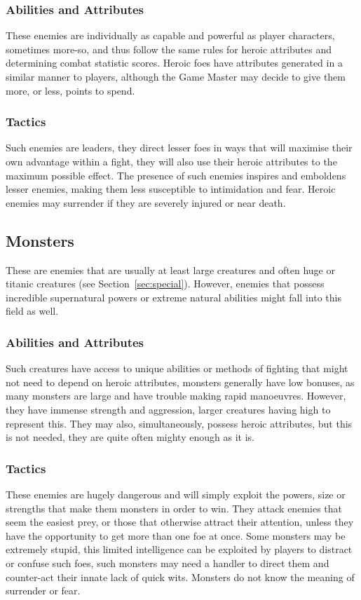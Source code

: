 \documentclass[a4paper,10pt,oneside]{book}
\newcommand{\textlf}[1]{\textbf{\titlecap{#1}}}
\begin{document}
\subsubsection{Abilities and Attributes}
These enemies are individually as capable and powerful as player characters, sometimes more-so, and thus follow the same rules for heroic attributes and determining combat statistic scores. Heroic foes have attributes generated in a similar manner to players, although the Game Master may decide to give them more, or less, points to spend.
\subsubsection{Tactics}
Such enemies are leaders, they direct lesser foes in ways that will maximise their own advantage within a fight, they will also use their heroic attributes to the maximum possible effect. The presence of such enemies inspires and emboldens lesser enemies, making them less susceptible to intimidation and fear. Heroic enemies may surrender if they are severely injured or near death.

\subsection{Monsters}
These are enemies that are usually at least large creatures and often huge or titanic creatures (see Section~\ref{sec:special}). However, enemies that possess incredible supernatural powers or extreme natural abilities might fall into this field as well.
\subsubsection{Abilities and Attributes}
Such creatures have access to unique abilities or methods of fighting that might not need to depend on heroic attributes, monsters generally have low \textlf{aim} bonuses, as many monsters are large and have trouble making rapid manoeuvres. However, they have immense strength and aggression, larger creatures having high \textlf{power} to represent this. They may also, simultaneously, possess heroic attributes, but this is not needed, they are quite often mighty enough as it is. 
\subsubsection{Tactics}
These enemies are hugely dangerous and will simply exploit the powers, size or strengths that make them monsters in order to win. They attack enemies that seem the easiest prey, or those that otherwise attract their attention, unless they have the opportunity to get more than one foe at once. Some monsters may be extremely stupid, this limited intelligence can be exploited by players to distract or confuse such foes, such monsters may need a handler to direct them and counter-act their innate lack of quick wits. Monsters do not know the meaning of surrender or fear.
\end{document}
